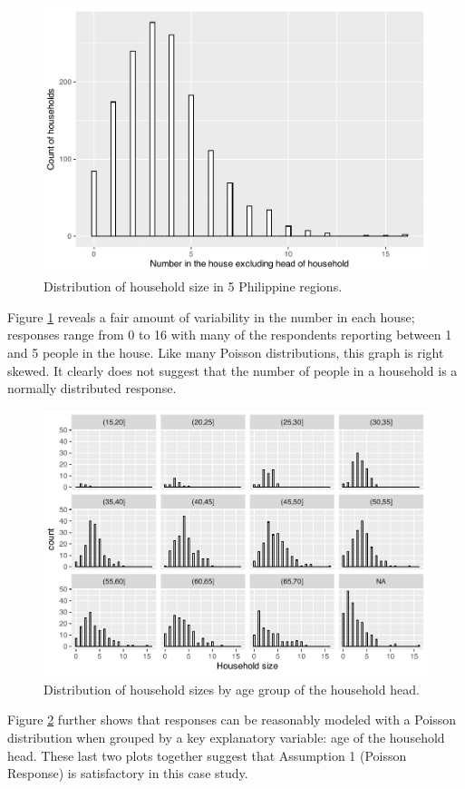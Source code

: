 \documentclass[
]{krantz}
\begin{document}
\begin{figure}

{\centering \includegraphics[width=0.6\linewidth]{bookdown-BeyondMLR_files/figure-latex/nhouse-1} 

}

\caption{Distribution of household size in 5 Philippine regions.}\label{fig:nhouse}
\end{figure}

Figure \ref{fig:nhouse} reveals a fair amount of variability in the number in each house; responses range from 0 to 16 with many of the respondents reporting between 1 and 5 people in the house. Like many Poisson distributions, this graph is right skewed. It clearly does not suggest that the number of people in a household is a normally distributed response.

\begin{figure}

{\centering \includegraphics[width=0.6\linewidth]{bookdown-BeyondMLR_files/figure-latex/totalPoisByAge-1} 

}

\caption{Distribution of household sizes by age group of the household head.}\label{fig:totalPoisByAge}
\end{figure}

Figure \ref{fig:totalPoisByAge} further shows that responses can be reasonably modeled with a Poisson distribution when grouped by a key explanatory variable: age of the household head. These last two plots together suggest that Assumption 1 (Poisson Response) is satisfactory in this case study.
\end{document}
